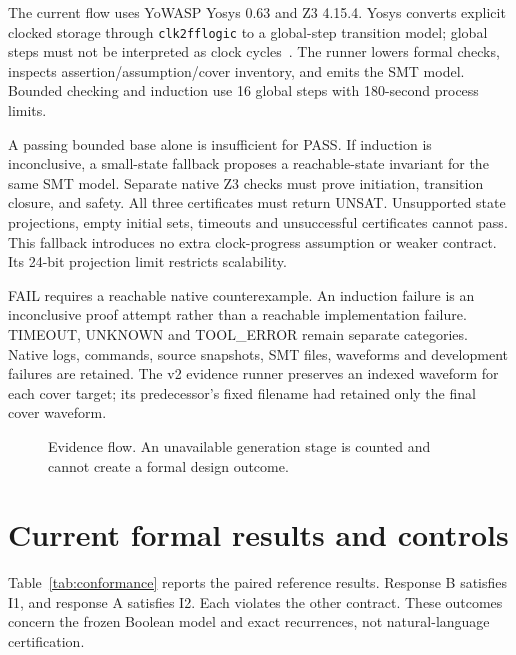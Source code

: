 \documentclass[11pt,a4paper]{article}
\begin{document}
The current flow uses YoWASP Yosys 0.63 and Z3 4.15.4. Yosys converts explicit clocked storage through \texttt{clk2fflogic} to a global-step transition model; global steps must not be interpreted as clock cycles~\cite{yosysclock}. The runner lowers formal checks, inspects assertion/assumption/cover inventory, and emits the SMT model. Bounded checking and induction use 16 global steps with 180-second process limits.

A passing bounded base alone is insufficient for PASS. If induction is inconclusive, a small-state fallback proposes a reachable-state invariant for the same SMT model. Separate native Z3 checks must prove initiation, transition closure, and safety. All three certificates must return UNSAT. Unsupported state projections, empty initial sets, timeouts and unsuccessful certificates cannot pass. This fallback introduces no extra clock-progress assumption or weaker contract. Its 24-bit projection limit restricts scalability.

FAIL requires a reachable native counterexample. An induction failure is an inconclusive proof attempt rather than a reachable implementation failure. TIMEOUT, UNKNOWN and TOOL\_ERROR remain separate categories. Native logs, commands, source snapshots, SMT files, waveforms and development failures are retained. The v2 evidence runner preserves an indexed waveform for each cover target; its predecessor's fixed filename had retained only the final cover waveform.

\begin{figure}[ht]

\caption{Evidence flow. An unavailable generation stage is counted and cannot create a formal design outcome.}
\label{fig:pipeline}
\end{figure}

\section{Current formal results and controls}
Table~\ref{tab:conformance} reports the paired reference results. Response B satisfies I1, and response A satisfies I2. Each violates the other contract. These outcomes concern the frozen Boolean model and exact recurrences, not natural-language certification.
\begin{table}[ht]
\centering
\caption{Current reference-to-contract conformance. FAIL is an expected reachable cross-contract mismatch.}
\label{tab:conformance}
\end{table}
\end{document}
